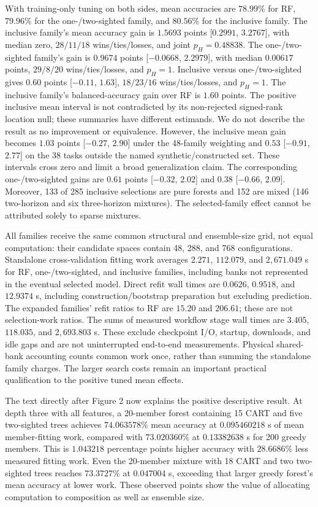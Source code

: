 \documentclass[11pt]{article}
\begin{document}
With training-only tuning on both sides, mean accuracies are $78.99\%$
for RF, $79.96\%$ for the one-/two-sighted family, and $80.56\%$ for
the inclusive family. The inclusive
family's mean accuracy gain is $1.5693$ points [$0.2991$, $3.2767$],
with median zero, $28/11/18$ wins/ties/losses, and joint $p_H=0.48838$.
The one-/two-sighted family's gain is $0.9674$ points [$-0.0668$, $2.2979$],
with median $0.00617$ points, $29/8/20$ wins/ties/losses, and $p_H=1$.
Inclusive versus one-/two-sighted gives $0.60$ points [$-0.11$, $1.63$],
$18/23/16$ wins/ties/losses, and $p_H=1$. The inclusive family's
balanced-accuracy gain over RF is $1.60$ points.
The positive inclusive mean interval is not contradicted by its non-rejected
signed-rank location null; these summaries have different estimands. We do
not describe the result as no improvement or equivalence. However, the
inclusive mean gain becomes $1.03$ points [$-0.27$, $2.90$] under the
48-family weighting and $0.53$ [$-0.91$, $2.77$] on the 38 tasks outside
the named synthetic/constructed set. These intervals cross zero and limit a broad
generalization claim. The corresponding one-/two-sighted gains are
$0.61$ points [$-0.32$, $2.02$] and $0.38$ [$-0.66$, $2.09$].
Moreover, 133 of 285 inclusive selections are pure
forests and 152 are mixed (146 two-horizon and six three-horizon mixtures).
The selected-family effect cannot be attributed solely to sparse mixtures.

All families receive the same common structural and ensemble-size grid,
not equal computation: their candidate spaces contain 48, 288, and 768
configurations. Standalone cross-validation fitting work averages $2.271$,
$112.079$, and $2,671.049$ s for RF, one-/two-sighted, and inclusive
families, including banks not represented in the eventual selected model.
Direct refit wall times are $0.0626$, $0.9518$, and $12.9374$ s, including
construction/bootstrap preparation but excluding prediction. The expanded
families' refit ratios to RF are $15.20$ and $206.61$; these are not
selection-work ratios. The sums of
measured workflow stage wall times are $3.405$, $118.035$, and $2,693.803$
s. These exclude checkpoint I/O, startup, downloads, and idle gaps and are
not uninterrupted end-to-end measurements. Physical shared-bank accounting
counts common work once, rather than summing the standalone family charges.
The larger search costs remain an important practical qualification to
the positive tuned mean effects.

The text directly after Figure 2 now explains the positive descriptive
result. At depth three with all features, a 20-member forest containing
15 CART and five two-sighted trees achieves $74.063578\%$ mean accuracy
at $0.095460218$ s of mean member-fitting work, compared with
$73.020360\%$ at $0.13382638$ s for 200 greedy members. This is
$1.043218$ percentage points higher accuracy with $28.6686\%$ less
measured fitting work. Even the 20-member mixture with 18 CART and
two two-sighted trees reaches $73.3727\%$ at $0.047004$ s, exceeding
that larger greedy forest's mean accuracy at lower work. These observed
points show the value of allocating computation to composition as well
as ensemble size.
\end{document}
